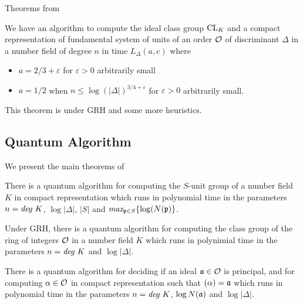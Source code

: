 Theorems from \cite{Find Generator Quantum}
\begin{theorem}
    We have an algorithm to compute the ideal class group \(\text{CL} _K\) and a compact representation of fundamental system of units of an order \(\mathcal{O}\) of discriminant \(\Delta\) in a number field of degree \(n\) in time \(L_\Delta (a, c)\) where 
    \begin{itemize}
        \item \(a = 2/3 + \varepsilon\) for \(\varepsilon > 0\) arbitrarily small
        \item \(a = 1/2\) when \(n\leq \log (|\Delta|)^{3/4 + \varepsilon}\) for \(\varepsilon > 0\) arbitrarily small.
    \end{itemize}
\end{theorem}
This theorem is under GRH and some more heuristics. 

\subsection{Quantum Algorithm}
We present the main theorems of \cite{Find Generator Quantum}
\begin{theorem}
    There is a quantum algorithm for computing the \(S\)-unit group of a number field \(K\) in compact representation which runs in polynomial time in the parameters \(n=\emph{deg } K\), \(\log |\Delta |\), \(|S|\) and \(\emph{max}_{\mathfrak{p}\in S}\{\log (N(\mathfrak{p} )\}\). 
\end{theorem}

\begin{theorem}
    Under GRH, there is a quantum algorithm for computing the class group of the ring of integers \(\mathcal{O}\) in a number field \(K\) which runs in polynimial time in the parameters \(n = \emph{deg } K\) and \(\log |\Delta |\).
\end{theorem}

\begin{theorem}
    There is a quantum algorithm for deciding if an ideal \(\mathfrak{a}\in\mathcal{O}\) is principal, and for computing \(\alpha\in\mathcal{O}\) in compact representation such that \((\alpha) = \mathfrak{a}\) which runs in polynomial time in the parameters \(n = \emph{deg } K\), \(\log N(\mathfrak{a})\) and \(\log |\Delta |\).
\end{theorem}
